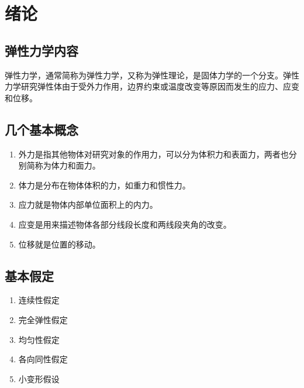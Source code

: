 \section{绪论}
\subsection{弹性力学内容}
弹性力学，通常简称为弹性力学，又称为弹性理论，是固体力学的一个分支。弹性力学研究弹性体由于受外力作用，边界约束或温度改变等原因而发生的应力、应变和位移。
\subsection{几个基本概念}
\begin{enumerate}
	\item 外力是指其他物体对研究对象的作用力，可以分为体积力和表面力，两者也分别简称为体力和面力。
	\item 体力是分布在物体体积的力，如重力和惯性力。
	\item 应力就是物体内部单位面积上的内力。
	\item 应变是用来描述物体各部分线段长度和两线段夹角的改变。
	\item 位移就是位置的移动。
\end{enumerate}
\subsection{基本假定}
\begin{enumerate}
	\item 连续性假定
	\item 完全弹性假定
	\item 均匀性假定
	\item 各向同性假定
	\item 小变形假设
\end{enumerate}